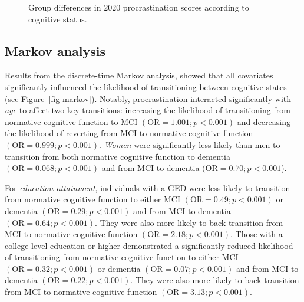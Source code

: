 \documentclass[
]{article}
\begin{document}
\begin{figure}


\caption{\label{fig-cross-sectional}Group differences in 2020
procrastination scores according to cognitive status.}

\end{figure}%

\subsection{Markov analysis}\label{markov-analysis}

Results from the discrete-time Markov analysis, showed that all
covariates significantly influenced the likelihood of transitioning
between cognitive states (see Figure~\ref{fig-markov}). Notably,
procrastination interacted significantly with \emph{age} to affect two
key transitions: increasing the likelihood of transitioning from
normative cognitive function to MCI \((\text{OR} = 1.001; p < 0.001)\)
and decreasing the likelihood of reverting from MCI to normative
cognitive function \((\text{OR} = 0.999; p < 0.001)\). \emph{Women} were
significantly less likely than men to transition from both normative
cognitive function to dementia \((\text{OR} = 0.068; p < 0.001)\) and
from MCI to dementia \((\text{OR} = 0.70; p < 0.001\)).

For \emph{education attainment}, individuals with a GED were less likely
to transition from normative cognitive function to either MCI
\((\text{OR} = 0.49; p < 0.001)\) or dementia
\((\text{OR} = 0.29; p < 0.001)\) and from MCI to dementia
\((\text{OR} = 0.64; p < 0.001)\). They were also more likely to back
transition from MCI to normative cognitive function
\((\text{OR} = 2.18; p < 0.001)\). Those with a college level education
or higher demonstrated a significantly reduced likelihood of
transitioning from normative cognitive function to either MCI
\((\text{OR} = 0.32; p < 0.001)\) or dementia
\((\text{OR} = 0.07; p < 0.001)\) and from MCI to dementia
\((\text{OR} = 0.22; p < 0.001)\). They were also more likely to back
transition from MCI to normative cognitive function
\((\text{OR} = 3.13; p < 0.001)\).
\end{document}
